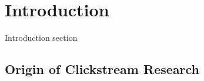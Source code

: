\section{Introduction}

Introduction section \cite{Bi:2013:OET:2470654.2470732}

\subsection{Origin of Clickstream Research}

\subsection{}



\cleardoublepage